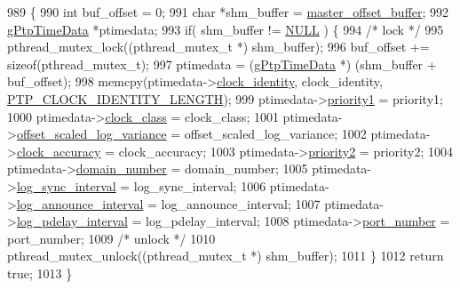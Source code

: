 \begin{DoxyCode}
989 \{
990     \textcolor{keywordtype}{int} buf\_offset = 0;
991     \textcolor{keywordtype}{char} *shm\_buffer = \hyperlink{class_linux_shared_memory_i_p_c_a028459163bd8b988344f6837036cb0be}{master\_offset\_buffer};
992     \hyperlink{structg_ptp_time_data}{gPtpTimeData} *ptimedata;
993     \textcolor{keywordflow}{if}( shm\_buffer != \hyperlink{openavb__types__base__pub_8h_a070d2ce7b6bb7e5c05602aa8c308d0c4}{NULL} ) \{
994         \textcolor{comment}{/* lock */}
995         pthread\_mutex\_lock((pthread\_mutex\_t *) shm\_buffer);
996         buf\_offset += \textcolor{keyword}{sizeof}(pthread\_mutex\_t);
997         ptimedata   = (\hyperlink{structg_ptp_time_data}{gPtpTimeData} *) (shm\_buffer + buf\_offset);
998         memcpy(ptimedata->\hyperlink{structg_ptp_time_data_af57b2186850d88240e6095da54758a2e}{clock\_identity}, clock\_identity, 
      \hyperlink{ptptypes_8hpp_afd1566058ed7927c2b790c9d4a0051ec}{PTP\_CLOCK\_IDENTITY\_LENGTH});
999         ptimedata->\hyperlink{structg_ptp_time_data_af98f08e3d1b016cd549310197ba8673c}{priority1} = priority1;
1000         ptimedata->\hyperlink{structg_ptp_time_data_aafe98ca785cdce0ce5eaa26f2930d2fe}{clock\_class} = clock\_class;
1001         ptimedata->\hyperlink{structg_ptp_time_data_a022841cfc4d83dc906f116eec53f1d9a}{offset\_scaled\_log\_variance} = offset\_scaled\_log\_variance;
1002         ptimedata->\hyperlink{structg_ptp_time_data_a708d6d971b6be997cf8d3e683951ceb0}{clock\_accuracy} = clock\_accuracy;
1003         ptimedata->\hyperlink{structg_ptp_time_data_ac04b889463a96b43985cb82020e3c39b}{priority2} = priority2;
1004         ptimedata->\hyperlink{structg_ptp_time_data_a96702548f5b9222af26319c695764b29}{domain\_number} = domain\_number;
1005         ptimedata->\hyperlink{structg_ptp_time_data_a2d4950b4c6da4dfa67688dcaf6139c9d}{log\_sync\_interval} = log\_sync\_interval;
1006         ptimedata->\hyperlink{structg_ptp_time_data_a15bb50a04ecd3ec11563012afc7e24a7}{log\_announce\_interval} = log\_announce\_interval;
1007         ptimedata->\hyperlink{structg_ptp_time_data_a26544b553c0b251da8e632533f260a5d}{log\_pdelay\_interval} = log\_pdelay\_interval;
1008         ptimedata->\hyperlink{structg_ptp_time_data_af0afa7bb85d49ac5ff873fad86a48ec5}{port\_number}   = port\_number;
1009         \textcolor{comment}{/* unlock */}
1010         pthread\_mutex\_unlock((pthread\_mutex\_t *) shm\_buffer);
1011     \}
1012     \textcolor{keywordflow}{return} \textcolor{keyword}{true};
1013 \}
\end{DoxyCode}


